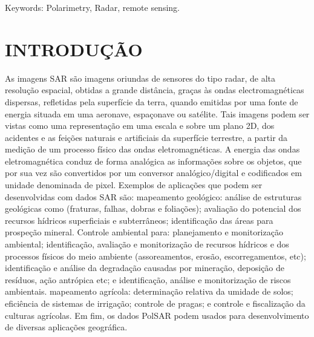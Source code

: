 \documentclass[a4paper,12pt]{article}
\begin{document}
Keywords: Polarimetry, Radar, remote sensing.
\newpage
\justifying
\section{INTRODUÇÃO}
\label{Int}

As imagens SAR são imagens oriundas de sensores do tipo radar, de alta resolução espacial, obtidas a grande distância, graças às ondas electromagnéticas dispersas, refletidas pela superfície da terra, quando emitidas por uma fonte de energia situada em uma aeronave, espaçonave ou satélite. Tais imagens podem ser vistas como uma representação em uma escala e sobre um plano 2D, dos acidentes e as feições naturais e artificiais da superfície terrestre, a partir da medição de um processo físico das ondas eletromagnéticas. A energia das ondas eletromagnética conduz de forma analógica as informações sobre os objetos, que por sua vez são convertidos por um conversor analógico/digital e codificados em unidade denominada de pixel. Exemplos de aplicações que podem ser desenvolvidas com dados SAR são: mapeamento geológico: análise de estruturas geológicas como (fraturas, falhas, dobras e foliações); avaliação do potencial dos recursos hídricos superficiais e subterrâneos;  identificação das áreas para prospeção mineral. Controle ambiental para: planejamento e monitorização ambiental; identificação, avaliação e monitorização de recursos hídricos e dos processos físicos do meio ambiente (assoreamentos, erosão, escorregamentos, etc); identificação e análise da degradação causadas por mineração, deposição de resíduos, ação antrópica etc; e identificação, análise e monitorização de riscos ambientais. mapeamento agrícola: determinação relativa da umidade de solos; eficiência de sistemas de irrigação; controle de pragas; e controle e fiscalização da culturas agrícolas. Em fim, os dados PolSAR podem usados para desenvolvimento de diversas aplicações geográfica.
\end{document}
